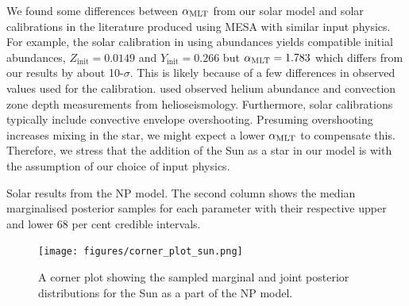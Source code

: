 We found some differences between ${\alpha_\mathrm{MLT}}$ from our solar model and solar calibrations in the literature produced using \textsc{MESA} with similar input physics. For example, the solar calibration in \citet{Stancliffe.Fossati.ea2016} using \citet{Asplund.Grevesse.ea2009} abundances yields compatible initial abundances, $Z_\mathrm{init} = 0.0149$ and $Y_\mathrm{init} = 0.266$ but ${\alpha_\mathrm{MLT}} = 1.783$ which differs from our results by about 10-$\sigma$. This is likely because of a few differences in observed values used for the calibration. \citet{Stancliffe.Fossati.ea2016} used observed helium abundance and convection zone depth measurements from helioseismology. Furthermore, solar calibrations typically include convective envelope overshooting. Presuming overshooting increases mixing in the star, we might expect a lower ${\alpha_\mathrm{MLT}}$ to compensate this. Therefore, we stress that the addition of the Sun as a star in our model is with the assumption of our choice of input physics.

\begin{table}
    \centering
    \caption[Solar results from the NP model.]{Solar results from the NP model. The second column shows the median marginalised posterior samples for each parameter with their respective upper and lower 68 per cent credible intervals.}
    \label{tab:sun-out}
    
\end{table}

\begin{figure}
    \centering
    \texttt{[image: figures/corner\_plot\_sun.png]}
    \caption{A corner plot showing the sampled marginal and joint posterior distributions for the Sun as a part of the NP model.}
    \label{fig:sun-results}
\end{figure}

